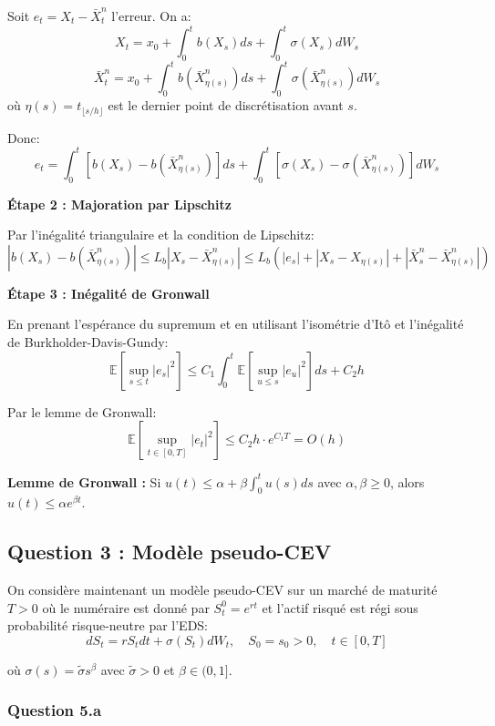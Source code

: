 \documentclass[12pt,a4paper]{article}
\theoremstyle{definition}
\newcommand{\E}{\mathbb{E}}
\begin{document}
Soit $e_t = X_t - \bar{X}_t^n$ l'erreur. On a:
\[
X_t = x_0 + \int_0^t b(X_s)ds + \int_0^t \sigma(X_s)dW_s
\]
\[
\bar{X}_t^n = x_0 + \int_0^t b(\bar{X}_{\eta(s)}^n)ds + \int_0^t \sigma(\bar{X}_{\eta(s)}^n)dW_s
\]
où $\eta(s) = t_{\lfloor s/h \rfloor}$ est le dernier point de discrétisation avant $s$.

Donc:
\[
e_t = \int_0^t [b(X_s) - b(\bar{X}_{\eta(s)}^n)]ds + \int_0^t [\sigma(X_s) - \sigma(\bar{X}_{\eta(s)}^n)]dW_s
\]

\textbf{Étape 2 : Majoration par Lipschitz}

Par l'inégalité triangulaire et la condition de Lipschitz:
\[
|b(X_s) - b(\bar{X}_{\eta(s)}^n)| \leq L_b |X_s - \bar{X}_{\eta(s)}^n| \leq L_b(|e_s| + |X_s - X_{\eta(s)}| + |\bar{X}_s^n - \bar{X}_{\eta(s)}^n|)
\]

\textbf{Étape 3 : Inégalité de Gronwall}

En prenant l'espérance du supremum et en utilisant l'isométrie d'Itô et l'inégalité de Burkholder-Davis-Gundy:
\[
\E\left[ \sup_{s \leq t} |e_s|^2 \right] \leq C_1 \int_0^t \E\left[ \sup_{u \leq s} |e_u|^2 \right] ds + C_2 h
\]

Par le lemme de Gronwall:
\[
\E\left[ \sup_{t \in [0,T]} |e_t|^2 \right] \leq C_2 h \cdot e^{C_1 T} = O(h)
\]

\begin{rappel}
\textbf{Lemme de Gronwall :} Si $u(t) \leq \alpha + \beta \int_0^t u(s)ds$ avec $\alpha, \beta \geq 0$, alors $u(t) \leq \alpha e^{\beta t}$.
\end{rappel}

\subsection{Question 3 : Modèle pseudo-CEV}

On considère maintenant un modèle pseudo-CEV sur un marché de maturité $T > 0$ où le numéraire est donné par $S_t^0 = e^{rt}$ et l'actif risqué est régi sous probabilité risque-neutre par l'EDS:
\[
dS_t = rS_t dt + \sigma(S_t)dW_t, \quad S_0 = s_0 > 0, \quad t \in [0,T]
\]

où $\sigma(s) = \tilde{\sigma} s^{\beta}$ avec $\tilde{\sigma} > 0$ et $\beta \in (0,1]$.

\subsubsection{Question 5.a}
\end{document}

